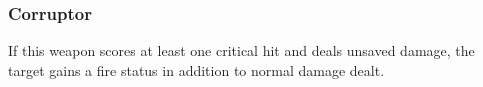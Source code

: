 \subsubsection{Corruptor}
If this weapon scores at least one critical hit and deals unsaved damage, the target gains a fire status in addition to normal damage dealt. 